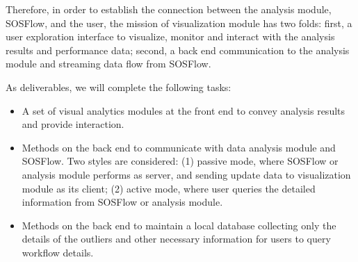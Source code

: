 Therefore, in order to establish the connection between the analysis module, SOSFlow, and the user, the mission of visualization module has two folds: first, a user exploration interface to visualize, monitor and interact with the analysis results and performance data; second, a back end communication to the analysis module and streaming data flow from SOSFlow. 

As deliverables, we will complete the following tasks:

\begin{itemize}
\item A set of visual analytics modules at the front end to convey analysis results and provide interaction.
\item Methods on the back end to communicate with data analysis module and SOSFlow. Two styles are considered: (1) passive mode, where SOSFlow or analysis module performs as server, and sending update data to visualization module as its client; (2) active mode, where user queries the detailed information from SOSFlow or analysis module. 
\item Methods on the back end to maintain a local database collecting only the details of the outliers and other necessary information for users to query workflow details.
\end{itemize}

